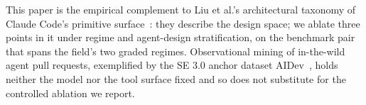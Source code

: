 \medskip
\noindent This paper is the empirical complement to Liu et al.'s
architectural taxonomy of Claude Code's primitive
surface~\cite{liu2026divecc}: they describe the design space; we
ablate three points in it under regime and agent-design stratification,
on the benchmark pair that spans the field's two graded regimes.
Observational mining of in-the-wild agent pull requests, exemplified
by the SE 3.0 anchor dataset AIDev~\cite{aidev2026}, holds neither
the model nor the tool surface fixed and so does not substitute for
the controlled ablation we report.
